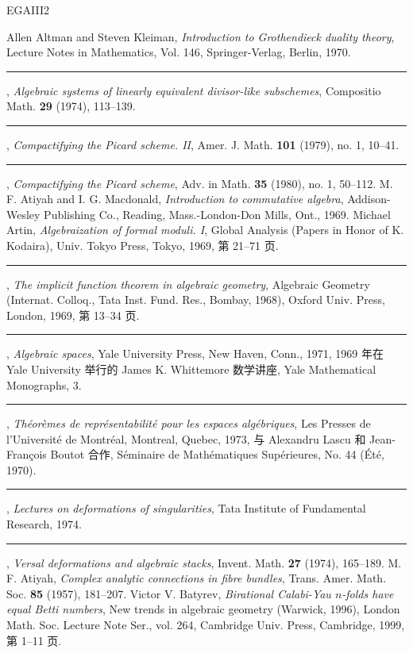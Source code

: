 \begin{thebibliography}{EGAIII2}
\small
 Allen Altman and Steven Kleiman, \emph{Introduction to Grothendieck duality theory}, Lecture Notes in Mathematics, Vol. 146, Springer-Verlag, Berlin, 1970.
 \rule{2em}{.3pt}, \emph{Algebraic systems of linearly equivalent divisor-like subschemes}, Compositio Math. \textbf{29} (1974), 113--139.
 \rule{2em}{.3pt}, \emph{Compactifying the Picard scheme. II}, Amer. J. Math. \textbf{101} (1979), no. 1, 10--41.
 \rule{2em}{.3pt}, \emph{Compactifying the Picard scheme}, Adv. in Math. \textbf{35} (1980), no. 1, 50--112.
 M. F. Atiyah and I. G. Macdonald, \emph{Introduction to commutative algebra}, Addison-Wesley Publishing Co., Reading, Mass.-London-Don Mills, Ont., 1969.
 Michael Artin, \emph{Algebraization of formal moduli. I}, Global Analysis (Papers in Honor of K. Kodaira), Univ. Tokyo Press, Tokyo, 1969, 第 21--71 页.
 \rule{2em}{.3pt}, \emph{The implicit function theorem in algebraic geometry}, Algebraic Geometry (Internat. Colloq., Tata Inst. Fund. Res., Bombay, 1968), Oxford Univ. Press, London, 1969, 第 13--34 页.
 \rule{2em}{.3pt}, \emph{Algebraic spaces}, Yale University Press, New Haven, Conn., 1971, 1969 年在 Yale University 举行的 James K. Whittemore 数学讲座, Yale Mathematical Monographs, 3.
 \rule{2em}{.3pt}, \emph{Théorèmes de représentabilité pour les espaces algébriques}, Les Presses de l'Université de Montréal, Montreal, Quebec, 1973, 与 Alexandru Lascu 和 Jean-François Boutot 合作, Séminaire de Mathématiques Supérieures, No. 44 (Été, 1970).
 \rule{2em}{.3pt}, \emph{Lectures on deformations of singularities}, Tata Institute of Fundamental Research, 1974.
 \rule{2em}{.3pt}, \emph{Versal deformations and algebraic stacks}, Invent. Math. \textbf{27} (1974), 165--189.
 M. F. Atiyah, \emph{Complex analytic connections in fibre bundles}, Trans. Amer. Math. Soc. \textbf{85} (1957), 181--207.
 Victor V. Batyrev, \emph{Birational Calabi-Yau $n$-folds have equal Betti numbers}, New trends in algebraic geometry (Warwick, 1996), London Math. Soc. Lecture Note Ser., vol. 264, Cambridge Univ. Press, Cambridge, 1999, 第 1--11 页.

\end{thebibliography}
